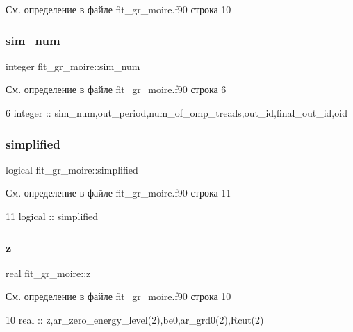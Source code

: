 См. определение в файле fit\+\_\+gr\+\_\+moire.\+f90 строка 10

\mbox{\label{namespacefit__gr__moire_aace6796e23a47584768373466a2a7522}} 
\subsubsection{\texorpdfstring{sim\+\_\+num}{sim\_num}}
{\footnotesize\ttfamily integer fit\+\_\+gr\+\_\+moire\+::sim\+\_\+num}



См. определение в файле fit\+\_\+gr\+\_\+moire.\+f90 строка 6


\begin{DoxyCode}
6 integer                 :: sim\_num,out\_period,num\_of\_omp\_treads,out\_id,final\_out\_id,oid
\end{DoxyCode}
\mbox{\label{namespacefit__gr__moire_a9092ed380be5233a800406322be81218}} 
\subsubsection{\texorpdfstring{simplified}{simplified}}
{\footnotesize\ttfamily logical fit\+\_\+gr\+\_\+moire\+::simplified}



См. определение в файле fit\+\_\+gr\+\_\+moire.\+f90 строка 11


\begin{DoxyCode}
11 logical                 :: simplified
\end{DoxyCode}
\mbox{\label{namespacefit__gr__moire_ad1616f835d2564c00ebea11a9c88cbaf}} 
\subsubsection{\texorpdfstring{z}{z}}
{\footnotesize\ttfamily real fit\+\_\+gr\+\_\+moire\+::z}



См. определение в файле fit\+\_\+gr\+\_\+moire.\+f90 строка 10


\begin{DoxyCode}
10 \textcolor{keywordtype}{real}                    :: z,ar\_zero\_energy\_level(2),be0,ar\_grd0(2),Rcut(2)
\end{DoxyCode}
